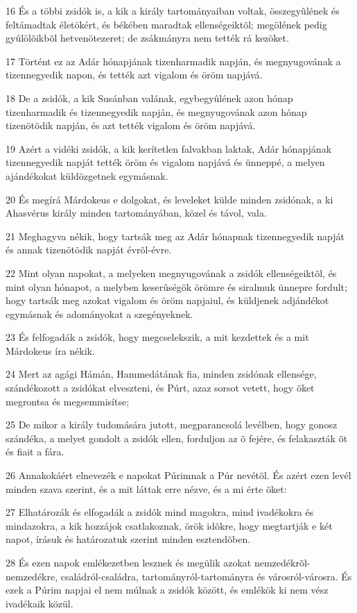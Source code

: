 \par 16 És a többi zsidók is, a kik a király tartományaiban voltak, összegyûlének és feltámadtak életökért, és békében maradtak ellenségeiktõl; megölének pedig gyûlölõikbõl hetvenötezeret; de zsákmányra nem tették rá kezöket.
\par 17 Történt ez az Adár hónapjának tizenharmadik napján, és megnyugovának a tizennegyedik napon, és tették azt vigalom és öröm napjává.
\par 18 De a zsidók, a kik Susánban valának, egybegyûlének azon hónap tizenharmadik és tizennegyedik napján, és megnyugovának azon hónap tizenötödik napján, és azt tették vigalom és öröm napjává.
\par 19 Azért a vidéki zsidók, a kik kerítetlen falvakban laktak, Adár hónapjának tizennegyedik napját tették öröm és vigalom napjává és ünneppé, a melyen ajándékokat küldözgetnek egymásnak.
\par 20 És megírá Márdokeus e dolgokat, és leveleket külde minden zsidónak, a ki Ahasvérus király minden tartományában, közel és távol, vala.
\par 21 Meghagyva nékik, hogy tartsák meg az Adár hónapnak tizennegyedik napját és annak tizenötödik napját évrõl-évre.
\par 22 Mint olyan napokat, a melyeken megnyugovának a zsidók ellenségeiktõl, és mint olyan hónapot, a melyben keserûségök örömre és siralmuk ünnepre fordult; hogy tartsák meg azokat vigalom és öröm napjaiul, és küldjenek adjándékot egymásnak és adományokat a szegényeknek.
\par 23 És felfogadák a zsidók, hogy megcselekszik, a mit kezdettek és a mit Márdokeus íra nékik.
\par 24 Mert az agági Hámán, Hammedátának fia, minden zsidónak ellensége, szándékozott a zsidókat elveszteni, és Púrt, azaz sorsot vetett, hogy õket megrontsa és megsemmisítse;
\par 25 De mikor a király tudomására jutott, megparancsolá levélben, hogy gonosz szándéka, a melyet gondolt a zsidók ellen, forduljon az õ fejére, és felakaszták õt és fiait a fára.
\par 26 Annakokáért elnevezék e napokat Púrimnak a Púr nevétõl. És azért ezen levél minden szava szerint, és a mit láttak erre nézve, és a mi érte õket:
\par 27 Elhatározák és elfogadák a zsidók mind magokra, mind ivadékokra és mindazokra, a kik hozzájok csatlakoznak, örök idõkre, hogy megtartják e két napot,  írásuk és határozatuk szerint minden esztendõben.
\par 28 És ezen napok emlékezetben lesznek és megülik azokat nemzedékrõl-nemzedékre, családról-családra, tartományról-tartományra és városról-városra. És ezek a Púrim napjai el nem múlnak a zsidók között, és emlékök ki nem vész ivadékaik közül.
